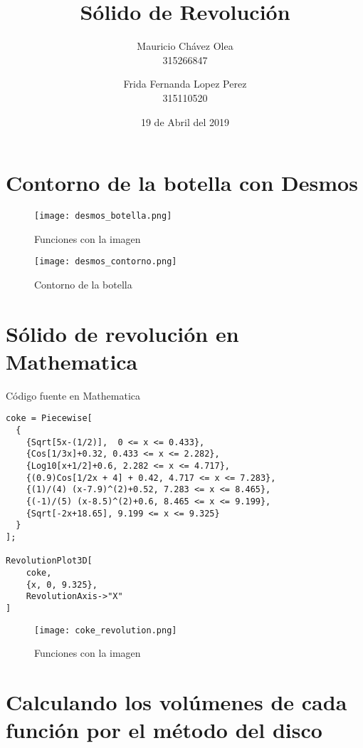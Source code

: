\documentclass{article}
\title{Sólido de Revolución}
\author{
    Mauricio Chávez Olea\\315266847
    \and
    Frida Fernanda Lopez Perez\\315110520
}
\date{19 de Abril del 2019}
\begin{document}
\maketitle

\section*{Contorno de la botella con Desmos}

\begin{figure}[h!]
  \centering
  \texttt{[image: desmos\_botella.png]}
  \caption{Funciones con la imagen}
  \label{fig:desmos_bottle}
\end{figure}

\begin{figure}[h!]
    \centering
    \texttt{[image: desmos\_contorno.png]}
    \caption{Contorno de la botella}
    \label{fig:desmos_contour}
\end{figure}

\pagebreak

\section*{Sólido de revolución en Mathematica}

\lstset{language=Mathematica}
Código fuente en Mathematica
\begin{lstlisting}[frame=single]
coke = Piecewise[
  {
    {Sqrt[5x-(1/2)],  0 <= x <= 0.433},
    {Cos[1/3x]+0.32, 0.433 <= x <= 2.282},
    {Log10[x+1/2]+0.6, 2.282 <= x <= 4.717},
    {(0.9)Cos[1/2x + 4] + 0.42, 4.717 <= x <= 7.283},
    {(1)/(4) (x-7.9)^(2)+0.52, 7.283 <= x <= 8.465},
    {(-1)/(5) (x-8.5)^(2)+0.6, 8.465 <= x <= 9.199},
    {Sqrt[-2x+18.65], 9.199 <= x <= 9.325}
  }
];

RevolutionPlot3D[
    coke, 
    {x, 0, 9.325},
    RevolutionAxis->"X"
]
\end{lstlisting}

\begin{figure}[h!]
  \centering
  \texttt{[image: coke\_revolution.png]}
  \caption{Funciones con la imagen}
  \label{fig:coke_revolution}
\end{figure}

\pagebreak

\section*{Calculando los volúmenes de cada función por el método del disco}
\end{document}
